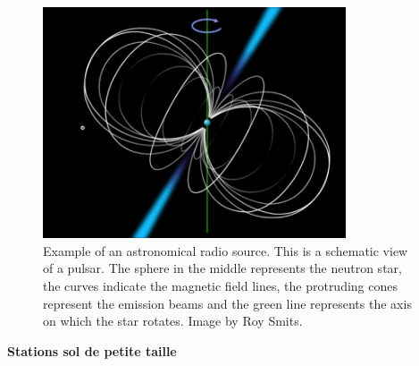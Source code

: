 \begin{figure}[H] %
    \centering
    \includegraphics[width=0.8\textwidth]{figures/3.9.jpg}
    \caption{Example of an astronomical radio source. This is a schematic view of a pulsar. The sphere in the middle represents the neutron star, the curves indicate the magnetic field lines, the protruding cones represent the emission beams and the green line represents the axis on which the star rotates. Image by Roy Smits.}
    \label{fig:communication2}
\end{figure}
\textbf{Stations sol de petite taille}

